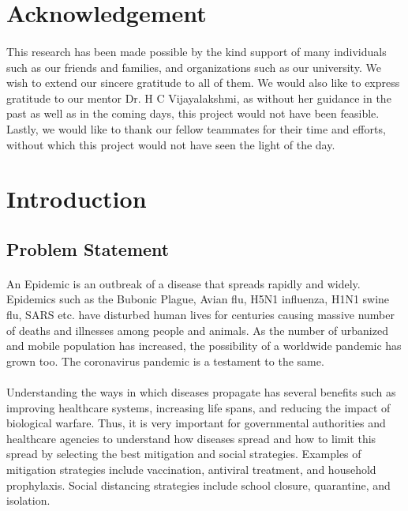 \documentclass[12pt, a4paper]{extarticle}
\begin{document}
    \section*{Acknowledgement}
        \paragraph{} This research has been made possible by the kind support of many individuals such as our friends and families, and organizations such as our university. We wish to extend our sincere gratitude to all of them. We would also like to express gratitude to our mentor Dr. H C Vijayalakshmi, as without her guidance in the past as well as in the coming days, this project would not have been feasible. Lastly, we would like to thank our fellow teammates for their time and efforts, without which this project would not have seen the light of the day.

    \newpage
	\tableofcontents
	
	\newpage
    \section{Introduction}
        \subsection{Problem Statement}
            \paragraph{} An Epidemic is an outbreak of a disease that spreads rapidly and widely. Epidemics such as the Bubonic Plague, Avian flu, H5N1 influenza, H1N1 swine flu, SARS etc. have disturbed human lives for centuries causing massive number of deaths and illnesses among people and animals. As the number of urbanized and mobile population has increased, the possibility of a worldwide pandemic has grown too. The coronavirus pandemic is a testament to the same.
            \paragraph{} Understanding the ways in which diseases propagate has several benefits such as improving healthcare systems, increasing life spans, and reducing the impact of biological warfare. Thus, it is very important for governmental authorities and healthcare agencies to understand how diseases spread and how to limit this spread by selecting the best mitigation and social strategies. Examples of mitigation strategies include vaccination, antiviral treatment, and household prophylaxis. Social distancing strategies include school closure, quarantine, and isolation.
\end{document}
